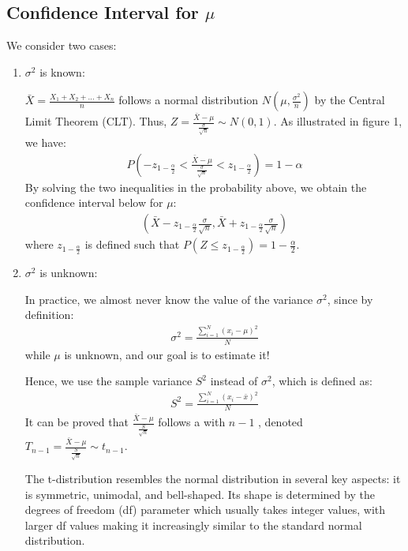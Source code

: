 \subsection{Confidence Interval for \( \mu \)}

We consider two cases:
\begin{enumerate}
    \item \( \sigma^2 \) is known:
    
    \( \bar{X} = \frac{X_1 + X_2 + \ldots + X_n}{n} \) follows a normal distribution \( N(\mu, \frac{\sigma^2}{n}) \) by the Central Limit Theorem (CLT).
    Thus, \( Z = \frac{\bar{X} - \mu}{\frac{\sigma}{\sqrt{n}}} \sim N(0, 1) \).
    As illustrated in figure 1, we have:
    \begin{gather*}
        P(-z_{1 - \frac{\alpha}{2}} < \frac{\bar{X} - \mu}{\frac{\sigma}{\sqrt{n}}} < z_{1 - \frac{\alpha}{2}}) = 1 - \alpha
    \end{gather*}
    By solving the two inequalities in the probability above, we obtain the confidence interval below for \( \mu \):
    \begin{gather*}
        (\bar{X} - z_{1 - \frac{\alpha}{2}}\frac{\sigma}{\sqrt{n}}, \bar{X} + z_{1 - \frac{\alpha}{2}}\frac{\sigma}{\sqrt{n}})
    \end{gather*}
    where \( z_{1 - \frac{\alpha}{2}} \) is defined such that \( P(Z \leq z_{1 - \frac{\alpha}{2}}) = 1 - \frac{\alpha}{2} \).
    \item \( \sigma^2 \) is unknown:
    
    In practice, we almost never know the value of the variance \( \sigma^2 \), since by definition:
    \begin{gather*}
        \sigma^2 = \frac{\sum_{i = 1}^{N}(x_i - \mu)^2}{N}
    \end{gather*}
    while \( \mu \) is unknown, and our goal is to estimate it!

    Hence, we use the sample variance \( S^2 \) instead of \( \sigma^2 \), which is defined as:
    \begin{gather*}
        S^2 = \frac{\sum_{i = 1}^{N}(x_i - \bar{x})^2}{N}
    \end{gather*}
    It can be proved that \( \frac{\bar{X} - \mu}{\frac{S}{\sqrt{n}}} \) follows a  with \( n - 1 \) ,
    denoted \( T_{n - 1} = \frac{\bar{X} - \mu}{\frac{S}{\sqrt{n}}} \sim t_{n - 1} \).

    The t-distribution resembles the normal distribution in several key aspects: it is symmetric, unimodal, and bell-shaped.
    Its shape is determined by the degrees of freedom (df) parameter which usually takes integer values, with larger df values making it increasingly similar to the standard normal distribution.


\end{enumerate}
